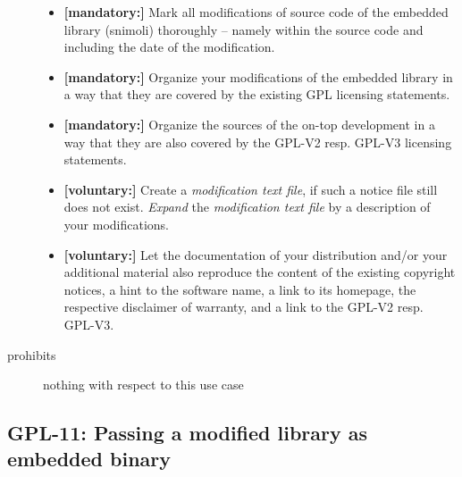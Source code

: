 \begin{description}
\begin{itemize}
  \item \textbf{[mandatory:]} Mark all modifications of source code of the
  embedded library (snimoli) thoroughly -- namely within the source code and
  including the date of the modification.
  
  \item \textbf{[mandatory:]} Organize your modifications of the embedded
  library in a way that they are covered by the existing GPL licensing
  statements. 
  
  \item \textbf{[mandatory:]} Organize the sources of the on-top development in
  a way that they are also covered by the GPL-V2 resp. GPL-V3 licensing
  statements.
     
  \item \textbf{[voluntary:]} Create a \emph{modification text file}, if such a
  notice file still does not exist. \emph{Expand} the \emph{modification text
  file} by a description of your modifications.
  
  \item \textbf{[voluntary:]} Let the documentation of your distribution and/or
  your additional material also reproduce the content of the existing
  copyright notices, a hint to the software name, a link to its homepage,
  the respective disclaimer of warranty, and a link to the GPL-V2 resp.
  GPL-V3.
  
\end{itemize}

\item[prohibits] nothing with respect to this use case

\end{description}

\subsection{GPL-11: Passing a modified library as embedded binary}
\label{OSUC-10B-GPL}

